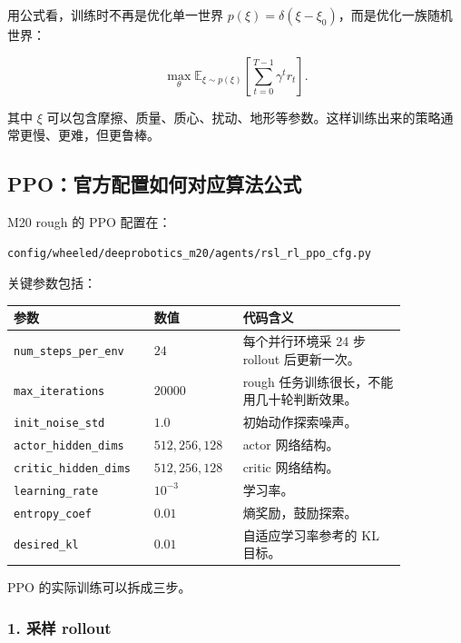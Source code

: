 \documentclass[UTF8,11pt,a4paper]{ctexart}
\begin{document}
用公式看，训练时不再是优化单一世界 \(p(\xi)=\delta(\xi-\xi_0)\)，而是优化一族随机世界：

\[
\boxed{
\max_\theta
\mathbb E_{\xi\sim p(\xi)}
\left[
\sum_{t=0}^{T-1}\gamma^t r_t
\right].
}
\]

其中 \(\xi\) 可以包含摩擦、质量、质心、扰动、地形等参数。这样训练出来的策略通常更慢、更难，但更鲁棒。

\subsection{PPO：官方配置如何对应算法公式}

M20 rough 的 PPO 配置在：

\begin{verbatim}
config/wheeled/deeprobotics_m20/agents/rsl_rl_ppo_cfg.py
\end{verbatim}

关键参数包括：

\begin{center}
\renewcommand{\arraystretch}{1.25}
\begin{tabular}{p{0.28\linewidth}p{0.20\linewidth}p{0.38\linewidth}}
\toprule
\textbf{参数} & \textbf{数值} & \textbf{代码含义}\\
\midrule
\texttt{num\_steps\_per\_env} & \(24\) & 每个并行环境采 24 步 rollout 后更新一次。\\
\texttt{max\_iterations} & \(20000\) & rough 任务训练很长，不能用几十轮判断效果。\\
\texttt{init\_noise\_std} & \(1.0\) & 初始动作探索噪声。\\
\texttt{actor\_hidden\_dims} & \(512,256,128\) & actor 网络结构。\\
\texttt{critic\_hidden\_dims} & \(512,256,128\) & critic 网络结构。\\
\texttt{learning\_rate} & \(10^{-3}\) & 学习率。\\
\texttt{entropy\_coef} & \(0.01\) & 熵奖励，鼓励探索。\\
\texttt{desired\_kl} & \(0.01\) & 自适应学习率参考的 KL 目标。\\
\bottomrule
\end{tabular}
\end{center}

PPO 的实际训练可以拆成三步。

\subsubsection{1. 采样 rollout}
\end{document}
